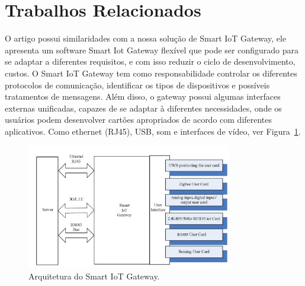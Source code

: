 \section{Trabalhos Relacionados}
\label{sec:trabalhosRelacionados}

O artigo \cite{designImplementationSIG} possui similaridades com a nossa solução de Smart IoT Gateway, ele apresenta um software Smart Iot Gateway flexível que pode ser configurado para se adaptar a diferentes requisitos, e com isso reduzir o ciclo de desenvolvimento, custos. O Smart IoT Gateway tem como responsabilidade controlar os diferentes protocolos de comunicação, identificar os tipos de dispositivos e possíveis tratamentos de mensagens. Além disso, o gateway possui algumas interfaces externas unificadas, capazes de se adaptar à diferentes necessidades, onde os usuários podem desenvolver cartões apropriados de acordo com diferentes aplicativos. Como ethernet (RJ45), USB, som e interfaces de vídeo, ver Figura~\ref{fig:arquiteturaDesignImpelementationSmartIoTGateway}.

\begin{figure}[h!]
	\begin{center}
		\includegraphics[width=0.8\textwidth]{./img/arquiteturaDesignImpelementationSmartIoTGateway}
		\caption{Arquitetura do Smart IoT Gateway.}
		\label{fig:arquiteturaDesignImpelementationSmartIoTGateway}
	\end{center}
\end{figure}


 
